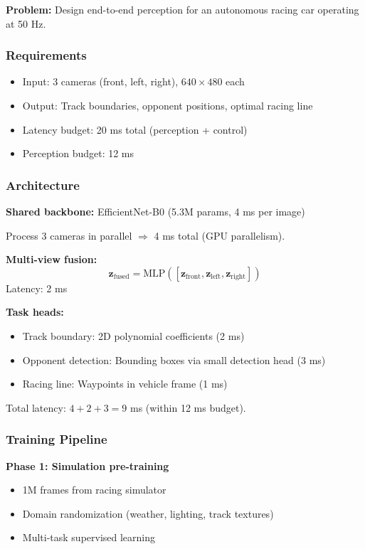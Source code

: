 \textbf{Problem:} Design end-to-end perception for an autonomous racing car operating at 50 Hz.

\subsubsection{Requirements}

\begin{itemize}
    \item Input: 3 cameras (front, left, right), $640 \times 480$ each
    \item Output: Track boundaries, opponent positions, optimal racing line
    \item Latency budget: 20 ms total (perception + control)
    \item Perception budget: 12 ms
\end{itemize}

\subsubsection{Architecture}

\textbf{Shared backbone:}
EfficientNet-B0 (5.3M params, 4 ms per image)

Process 3 cameras in parallel $\Rightarrow$ 4 ms total (GPU parallelism).

\textbf{Multi-view fusion:}
\begin{equation}
\mathbf{z}_{\text{fused}} = \text{MLP}([\mathbf{z}_{\text{front}}, \mathbf{z}_{\text{left}}, \mathbf{z}_{\text{right}}])
\label{eq:racing_fusion}
\end{equation}
Latency: 2 ms

\textbf{Task heads:}
\begin{itemize}
    \item Track boundary: 2D polynomial coefficients (2 ms)
    \item Opponent detection: Bounding boxes via small detection head (3 ms)
    \item Racing line: Waypoints in vehicle frame (1 ms)
\end{itemize}

Total latency: $4 + 2 + 3 = 9$ ms (within 12 ms budget).

\subsubsection{Training Pipeline}

\textbf{Phase 1: Simulation pre-training}
\begin{itemize}
    \item 1M frames from racing simulator
    \item Domain randomization (weather, lighting, track textures)
    \item Multi-task supervised learning
\end{itemize}

